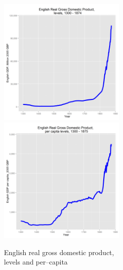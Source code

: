 \documentclass[final]{beamer}
\begin{document}
\begin{frame}
		\begin{figure}[p!]
		\caption{English real gross domestic product, \\
		levels and per--capita }
		\label{fig:ggdp}		
		\centerline{
		\mbox{\includegraphics[width=0.55\textwidth]{ggdp}}
		\mbox{\includegraphics[width=0.55\textwidth]{ggdppop}}
		}
		\end{figure}
\end{frame}
\end{document}
